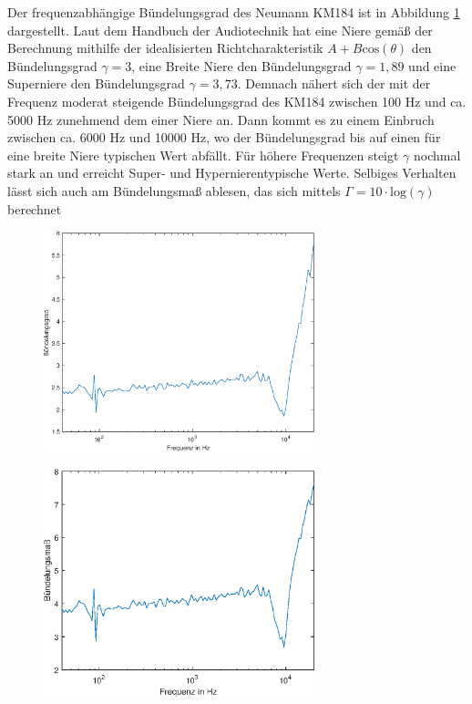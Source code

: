 Der frequenzabhängige Bündelungsgrad des Neumann KM184 ist in Abbildung \ref{fig:buendel} dargestellt. 
Laut dem Handbuch der Audiotechnik \cite{Weinzierl08} hat eine Niere gemäß der Berechnung mithilfe der idealisierten Richtcharakteristik $A + B \mathrm{cos}(\theta)$ den Bündelungsgrad $\gamma = 3$, eine Breite Niere den Bündelungsgrad $\gamma = 1,89$ und eine Superniere den Bündelungsgrad $\gamma = 3,73$.
Demnach nähert sich der mit der Frequenz moderat steigende Bündelungsgrad des KM184 zwischen 100 Hz und ca. 5000 Hz zunehmend dem einer Niere an.
Dann kommt es zu einem Einbruch zwischen ca. 6000 Hz und 10000 Hz, wo der Bündelungsgrad bis auf einen für eine breite Niere typischen Wert abfällt. 
Für höhere Frequenzen steigt $\gamma$ nochmal stark an und erreicht  Super- und Hypernierentypische Werte. 
Selbiges Verhalten lässt sich auch am Bündelungsmaß ablesen, das sich mittels $\Gamma = 10\cdot \mathrm{log}(\gamma)$ berechnet

\begin{figure}[bth]
    \centering
    \includegraphics[width=0.7\textwidth]{Figures/Buendelungsgrad}
    \label{fig:buendel}
\end{figure}

\begin{figure}[bth]
    \centering
    \includegraphics[width=0.7\textwidth]{Figures/Buendelungsmass}
    \label{fig:buendelm}
\end{figure}

